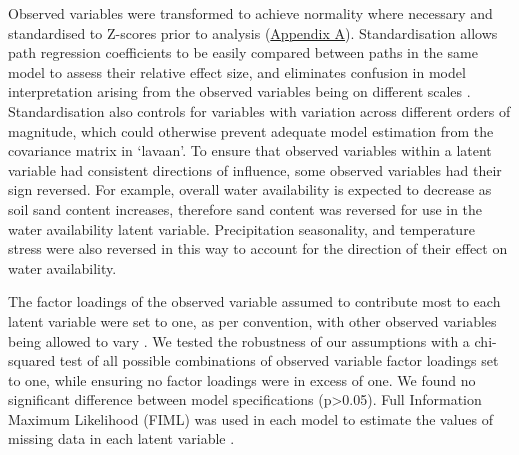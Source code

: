 \documentclass[11pt,a4paper]{article}
\begin{document}
Observed variables were transformed to achieve normality where necessary and standardised to Z-scores prior to analysis (\hyperref[appendixa]{Appendix A}). Standardisation allows path regression coefficients to be easily compared between paths in the same model to assess their relative effect size, and eliminates confusion in model interpretation arising from the observed variables being on different scales \citep{Beaujean2014}. Standardisation also controls for variables with variation across different orders of magnitude, which could otherwise prevent adequate model estimation from the covariance matrix in `lavaan'. To ensure that observed variables within a latent variable had consistent directions of influence, some observed variables had their sign reversed. For example, overall water availability is expected to decrease as soil sand content increases, therefore sand content was reversed for use in the water availability latent variable. Precipitation seasonality, and temperature stress were also reversed in this way to account for the direction of their effect on water availability. 

The factor loadings of the observed variable assumed to contribute most to each latent variable were set to one, as per convention, with other observed variables being allowed to vary \citep{Beaujean2014}.  We tested the robustness of our assumptions with a chi-squared test of all possible combinations of observed variable factor loadings set to one, while ensuring no factor loadings were in excess of one. We found no significant difference between model specifications (p>0.05). Full Information Maximum Likelihood (FIML) was used in each model to estimate the values of missing data in each latent variable \citep{Cham2017}.
\end{document}
